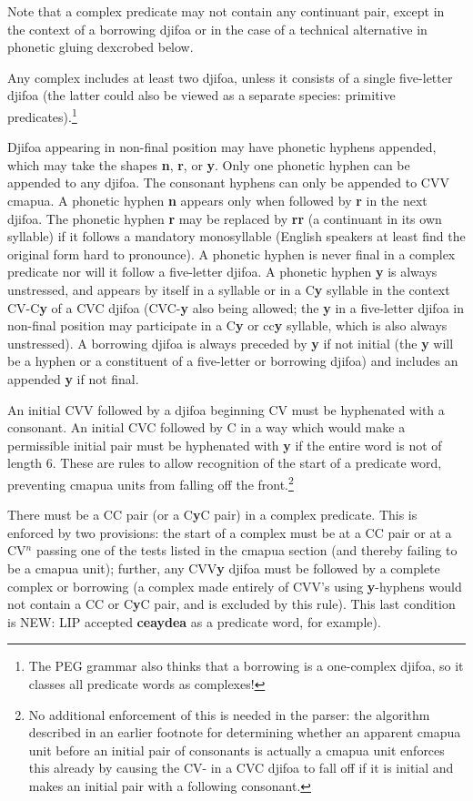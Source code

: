 \documentclass[12pt]{book}
\begin{document}
Note that a complex predicate may not contain any continuant pair, except in the context of a borrowing djifoa or in the case of a technical alternative in phonetic gluing dexcrobed below.

Any complex includes at least two djifoa, unless it consists of a single five-letter djifoa (the latter could also be viewed as a separate species: primitive predicates).\footnote{The PEG grammar also thinks that a borrowing is a one-complex djifoa, so it classes all predicate words as complexes!}

Djifoa appearing in non-final position may have phonetic hyphens appended, which may take the shapes {\bf n}, {\bf r}, or {\bf y}.   Only one phonetic hyphen can be appended to any djifoa.  The consonant hyphens can only be appended to CVV cmapua.
A phonetic hyphen {\bf n} appears only when followed by {\bf r} in the next djifoa.  The phonetic hyphen {\bf r} may be replaced by {\bf rr} (a continuant in its own syllable) if it follows a mandatory monosyllable (English speakers at least find the original form hard to pronounce).  A phonetic hyphen is never final in a complex predicate nor will it follow a five-letter djifoa.  A phonetic hyphen {\bf y} is always unstressed, and appears by itself in a syllable or in a C{\bf y} syllable in the context CV-C{\bf y} of a CVC djifoa (CVC-{\bf y} also being allowed;  the {\bf y} in a five-letter djifoa in non-final position may participate in a C{\bf y} or cc{\bf y} syllable, which is also always unstressed).  A borrowing djifoa is always preceded by {\bf y} if not initial (the {\bf y} will be a hyphen or a constituent of a five-letter or borrowing djifoa) and includes an appended {\bf y} if not final.

An initial CVV followed by a djifoa beginning CV must be hyphenated with a consonant.  An initial CVC followed by C in a way which would make
a permissible initial pair must be hyphenated with {\bf y} if the entire word is not of length 6.  These are rules to allow recognition of the start of
a predicate word, preventing cmapua units from falling off the front.\footnote{No additional enforcement of this is needed in the parser:  the algorithm described in an earlier footnote for determining whether an apparent cmapua unit before an initial pair of consonants is actually a cmapua unit enforces this already by causing the CV- in a CVC djifoa to fall off if it is initial and makes an initial pair with a following consonant.}

There must be a CC pair (or a C{\bf y}C pair) in a complex predicate.  This is enforced by two provisions:  the start of a complex must be at a CC pair or
at a CV$^n$ passing one of the tests listed in the cmapua section (and thereby failing to be a cmapua unit);  further, any CVV{\bf y} djifoa must be followed by a complete complex or borrowing  (a complex made entirely of CVV's using {\bf y}-hyphens would not contain a CC or C{\bf y}C pair, and is excluded by this rule).  This last condition is NEW:
LIP accepted {\bf ceaydea} as a predicate word, for example).
\end{document}
